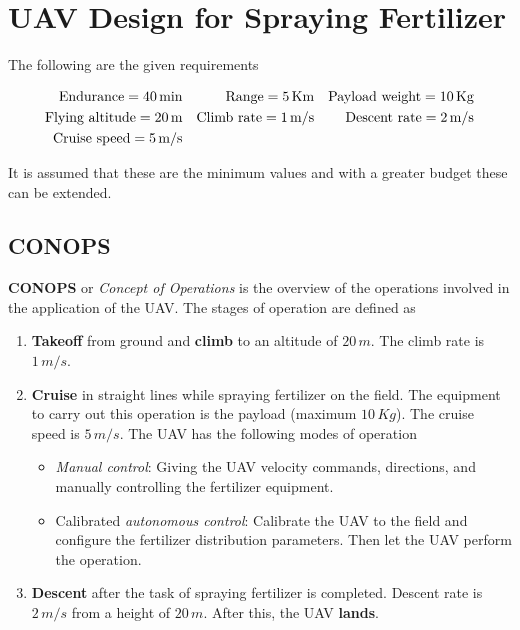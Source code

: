 \section{UAV Design for Spraying Fertilizer}

The following are the given requirements

\begin{align*}
    \textup{Endurance} = 40 \, \textup{min} &&
    \textup{Range} = 5 \, \textup{Km} &&
    \textup{Payload weight} = 10 \, \textup{Kg} \\
    \textup{Flying altitude} = 20 \, \textup{m} &&
    \textup{Climb rate} = 1 \, \textup{m/s} &&
    \textup{Descent rate} = 2 \, \textup{m/s} \\
    \textup{Cruise speed} = 5 \, \textup{m/s}
\end{align*}

It is assumed that these are the minimum values and with a greater budget these can be extended.

\subsection{CONOPS}

\textbf{CONOPS} or \emph{Concept of Operations} is the overview of the operations involved in the application of the UAV. The stages of operation are defined as

\begin{enumerate}
    \item \textbf{Takeoff} from ground and \textbf{climb} to an altitude of $20 \, m$. The climb rate is $1 \, m/s$.
    \item \textbf{Cruise} in straight lines while spraying fertilizer on the field. The equipment to carry out this operation is the payload (maximum $10 \, Kg$). The cruise speed is $5 \, m/s$. The UAV has the following modes of operation
    \begin{itemize}
        \item \emph{Manual control}: Giving the UAV velocity commands, directions, and manually controlling the fertilizer equipment.
        \item Calibrated \emph{autonomous control}: Calibrate the UAV to the field and configure the fertilizer distribution parameters. Then let the UAV perform the operation.
    \end{itemize}
    \item \textbf{Descent} after the task of spraying fertilizer is completed. Descent rate is $2 \, m/s$ from a height of $20 \, m$. After this, the UAV \textbf{lands}.
\end{enumerate}

